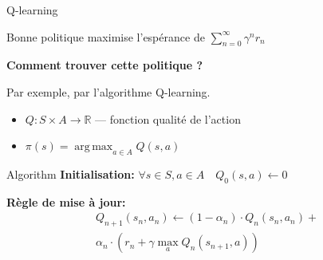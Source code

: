 \documentclass{beamer}
\newcommand{\R}{\mathbb{R}}
\DeclareMathOperator*{\argmax}{arg\,max}
\begin{document}
\begin{frame}[t]{Q-learning}

  Bonne politique maximise l'espérance de $\sum_{n = 0}^\infty \gamma^n r_n$
  \vspace{2em}

  {\bf Comment trouver cette politique ?} 

  Par exemple, par l'algorithme Q-learning.
  
  \begin{definition}
    \begin{itemize}
    \item  $Q : S \times A \to \R$ --- fonction qualité de l'action 
    \item  $\pi (s) = \argmax_{a \in A} Q(s, a)$
    \end{itemize}
  \end{definition}
  
  \vspace{-1em}
  \begin{block}{Algorithm}
    {\bf Initialisation:} $\forall s \in S, a \in A  \quad Q_0 (s,a) \leftarrow 0$
    \vspace{1em}

    {\bf Règle de mise à jour:}
    \vspace{-1em}\begin{multline*}
      Q_{n+1}(s_n,a_n) \leftarrow (1 - \alpha_n) \cdot Q_n(s_n,a_n)  + \\
      \alpha_n \cdot \left( r_n + \gamma \max_a Q_n(s_{n+1},a)     \right)
    \end{multline*}
  \end{block}

\end{frame}


\end{document}
